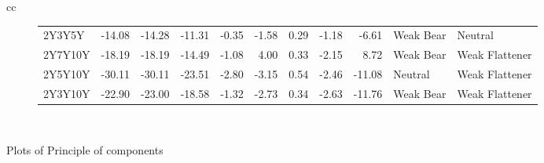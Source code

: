 \documentclass[a4paper,oneside]{report}
\begin{document}
\begin{figure}[htbp]
\begin{tabular}[c]{cc}
\begin{subfigure}[c]{0.5\textwidth}
\begin{adjustbox}{max width=\textwidth}
\begin{tabular}{lrrrrrrrrll}
    2Y3Y5Y & -14.08 &   -14.28 &    -11.31 &  -0.35 & -1.58 &      0.29 &  -1.18 &    -6.61 &    Weak Bear &         Neutral \\
   2Y7Y10Y & -18.19 &   -18.19 &    -14.49 &  -1.08 &  4.00 &      0.33 &  -2.15 &     8.72 &    Weak Bear &  Weak Flattener \\
   2Y5Y10Y & -30.11 &   -30.11 &    -23.51 &  -2.80 & -3.15 &      0.54 &  -2.46 &   -11.08 &      Neutral &  Weak Flattener \\
   2Y3Y10Y & -22.90 &   -23.00 &    -18.58 &  -1.32 & -2.73 &      0.34 &  -2.63 &   -11.76 &    Weak Bear &  Weak Flattener \\
\hline
\end{tabular}
\end{adjustbox}
 \end{subfigure}\\
 
 
 
\end{tabular}
 \caption{Plots of Principle of components}\label{fig:bubble plots}
 \end{figure}  
 
 
 
 
 
 
 
 



 
\end{document}
